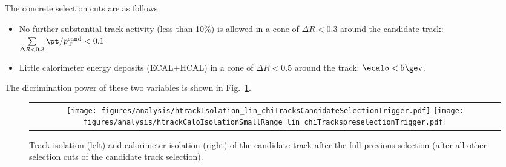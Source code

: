 The concrete selection cuts are as follows
\begin{itemize}
\renewcommand{\labelitemi}{\footnotesize{\ding{118}}}
\item No further substantial track activity (less than 10\%) is allowed in a cone of $\Delta R < 0.3$ around the candidate track: \mbox{$\sum \limits_{\Delta R < 0.3} \pt/p_{\text{T}}^{\text{cand}} < 0.1$}
\item Little calorimeter energy deposits (ECAL+HCAL) in a cone of $\Delta R < 0.5$ around the track: \mbox{$\ecalo<5\gev$}.
\end{itemize}
The dicrimination power of these two variables is shown in Fig.~\ref{fig:TrackIso_Ecalo_After_Preselection}.\\
\begin{figure}[!t]
  \centering 
  \begin{tabular}{c}
    \texttt{[image: figures/analysis/htrackIsolation\_lin\_chiTracksCandidateSelectionTrigger.pdf]}
    \texttt{[image: figures/analysis/htrackCaloIsolationSmallRange\_lin\_chiTrackspreselectionTrigger.pdf]}
  \end{tabular}
  \caption{Track isolation (left) and calorimeter isolation (right) of the candidate track after the full previous selection (after all other selection cuts of the candidate track selection).}
  \label{fig:TrackIso_Ecalo_After_Preselection}
\end{figure}

